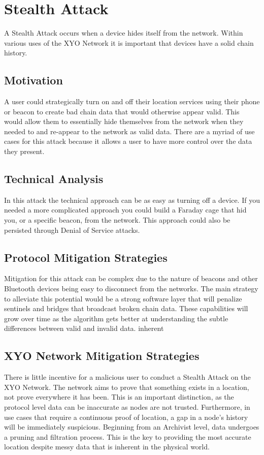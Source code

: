 \documentclass{article}
\begin{document}
\section{Stealth Attack}
A Stealth Attack occurs when a device hides itself from the network. Within various uses of the XYO Network it is important that devices have a solid chain history. 

\subsection{Motivation}
A user could strategically turn on and off their location services using their phone or beacon to create bad chain data that would otherwise appear valid. This would allow them to essentially hide themselves from the network when they needed to and re-appear to the network as valid data. There are a myriad of use cases for this attack because it allows a user to have more control over the data they present.

\subsection{Technical Analysis}
In this attack the technical approach can be as easy as turning off a device. If you needed a more complicated approach you could build a Faraday cage that hid you, or a specific beacon, from the network. This approach could also be persisted through Denial of Service attacks. 

\subsection{Protocol Mitigation Strategies}
Mitigation for this attack can be complex due to the nature of beacons and other Bluetooth devices being easy to disconnect from the networks. The main strategy to alleviate this potential would be a strong software layer that will penalize sentinels and \gls{bridge}s that broadcast broken chain data. These capabilities will grow over time as the algorithm gets better at understanding the subtle differences between valid and invalid data. 
inherent
\subsection{XYO Network Mitigation Strategies}
There is little incentive for a malicious user to conduct a Stealth Attack on the XYO Network. The network aims to prove that something exists in a location, not prove everywhere it has been. This is an important distinction, as the protocol level data can be inaccurate as nodes are not trusted. Furthermore, in use cases that require a continuous proof of location, a gap in a node's history will be immediately suspicious. Beginning from an Archivist level, data undergoes a pruning and filtration process. This is the key to providing the most accurate location despite messy data that is inherent in the physical world. 
\end{document}
